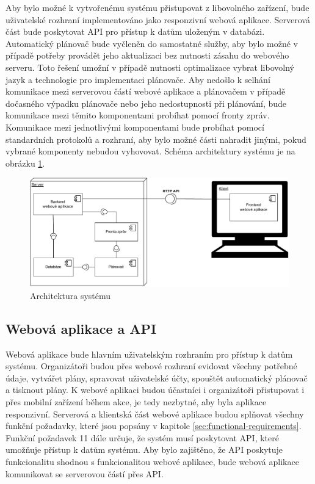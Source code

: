 Aby bylo možné k vytvořenému systému přistupovat z libovolného zařízení, bude uživatelské rozhraní implementováno jako responzivní webová aplikace. Serverová část 
bude poskytovat API pro přístup k datům uloženým v databázi. Automatický plánovač bude vyčleněn do samostatné služby, aby bylo možné v případě potřeby provádět
jeho aktualizaci bez nutnosti zásahu do webového serveru. Toto řešení umožní v případě nutnosti optimalizace vybrat libovolný jazyk a technologie pro implementaci plánovače.
Aby nedošlo k selhání komunikace mezi serverovou částí webové aplikace a plánovačem v případě dočasného výpadku plánovače nebo jeho nedostupnosti při plánování, bude komunikace
mezi těmito komponentami probíhat pomocí fronty zpráv. Komunikace mezi jednotlivými komponentami bude probíhat pomocí standardních protokolů a rozhraní, aby bylo možné
 části nahradit jinými, pokud vybrané komponenty nebudou vyhovovat.
Schéma architektury systému je na obrázku \ref{fig:architecture}.

\begin{figure}[h]
    \centering
    \includegraphics[width=\textwidth]{chapters/images/architektura}
    \caption{Architektura systému}
    \label{fig:architecture}
\end{figure}

\subsection{Webová aplikace a API}

Webová aplikace bude hlavním uživatelským rozhraním pro přístup k datům systému. Organizátoři budou přes webové rozhraní evidovat všechny potřebné údaje, vytvářet plány,
spravovat uživatelské účty, spouštět automatický plánovač a tisknout plány. K webové aplikaci budou účastníci i organizátoři přistupovat i přes mobilní zařízení během akce, 
je tedy nezbytné, aby byla aplikace responzivní. Serverová a klientská část webové aplikace budou splňovat všechny funkční požadavky, které jsou popsány v kapitole \ref{sec:functional-requirements}.
Funkční požadavek 11 dále určuje, že systém musí poskytovat API, které umožňuje přístup k datům systému. Aby bylo zajištěno,
že API poskytuje funkcionalitu shodnou s funkcionalitou webové aplikace, bude webová aplikace komunikovat se serverovou částí přes API.

